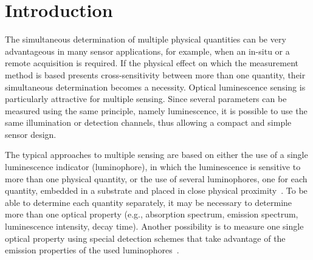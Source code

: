 \documentclass[sensors,article,accept,moreauthors,pdftex,10pt,a4paper]{Definitions/mdpi}
\begin{document}


\section{Introduction}
\label{Introduction}

The simultaneous determination of multiple physical quantities can be very advantageous in many sensor applications, for example, when an in-situ or a remote acquisition is required. 
If the physical effect on which the measurement method is based presents cross-sensitivity between more than one quantity, their simultaneous determination becomes a necessity.
Optical luminescence sensing is particularly attractive for multiple sensing. 
Since several parameters can be measured using the same principle, namely luminescence, it is possible to use the same illumination or detection channels, thus allowing a compact and simple sensor design.

The typical approaches to multiple sensing are based on either the use of a single luminescence indicator (luminophore), in which the luminescence is sensitive to more than one physical quantity, or the use of several luminophores, one for each quantity, embedded in a substrate and placed in close physical proximity~\cite{Stich2010,Borisov2011novel,Kameya2014,Wang2014,Santoro2016,Biring2019, wolfbeis1991feasibility, zieger2020tadf, ohira2009fiber}. To be able to determine each quantity separately, it may be necessary to determine more than one optical property (e.g., absorption spectrum, emission spectrum, luminescence intensity, decay time). Another possibility is to measure one single optical property using special detection schemes that take advantage of the emission properties of the used luminophores~\cite{Wang2014,Biring2019,Collier2013,Stehning2004,Jorge2008,Moore2006}. 
\end{document}
